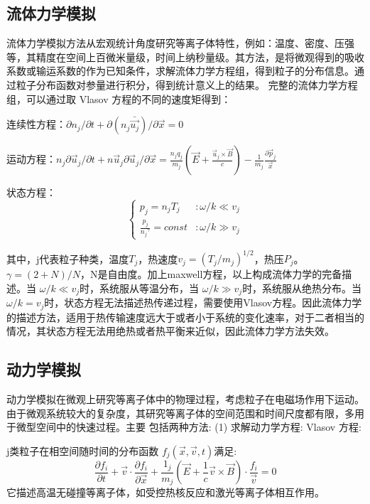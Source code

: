 \subsection{流体力学模拟}


流体力学模拟方法从宏观统计角度研究等离子体特性，例如：温度、密度、压强等，其精度在空间上百微米量级，时间上纳秒量级。其方法，是将微观得到的吸收系数或输运系数的作为已知条件，求解流体力学方程组，得到粒子的分布信息。通过粒子分布函数对参量进行积分，得到统计意义上的结果。
完整的流体力学方程组，可以通过取 Vlasov 方程的不同的速度矩得到：

连续性方程：$\partial{n_j}/\partial{t}+\partial{(n_j \bar{\vec{u_j}})}/\partial{\vec{x}} =0$


运动方程：$n_j \partial {\vec{u}_j}/\partial{t}+n \vec{u}_j \partial{\vec{u}_j}/\partial{\vec{x}} = \frac{n_j q_j}{m_j} ( \vec{E}+\frac{\vec{u}_j \times \vec{B}}{c}) - \frac{1}{m_j} \frac{\partial{\vec{p}_j}}{\vec{x}}$

状态方程：
\begin{equation}
  \begin{cases}
    p_j=n_j T_j & : \omega / k \ll v_j\\
    \frac{p_j}{{n_j}^{\gamma}}=const & : \omega / k \gg v_j
  \end{cases}
\end{equation}



其中，j代表粒子种类，温度$T_j$，热速度$v_j=(T_j/m_j)^{1/2}$，热压$P_j$。
$\gamma=(2+N)/N$，N是自由度。加上maxwell方程，以上构成流体力学的完备描述。当 $\omega / k \ll v_j$时，系统服从等温分布，当 $\omega / k \gg v_j$时，系统服从绝热分布。当 $\omega / k = v_j$时，状态方程无法描述热传递过程，需要使用Vlasov方程。因此流体力学的描述方法，适用于热传输速度远大于或者小于系统的变化速率，对于二者相当的情况，其状态方程无法用绝热或者热平衡来近似，因此流体力学方法失效。

\subsection{动力学模拟}


动力学模拟在微观上研究等离子体中的物理过程，考虑粒子在电磁场作用下运动。由于微观系统较大的复杂度，其研究等离子体的空间范围和时间尺度都有限，多用于微型空间中的快速过程。主要
包括两种方法:
(1) 求解动力学方程:
Vlasov 方程:

j类粒子在相空间随时间的分布函数 $f_j(\vec{x},\vec{v},t)$满足:
\begin{equation}
\frac{\partial{f_i}}{\partial{t}} + \vec{v} \cdot \frac{\partial{f_i}}{\partial{\vec{x}}} + \frac{1_j}{m_j}(\vec{E}+\frac{1}{c} \vec{v} \times \vec{B}) \cdot \frac{f_i}{\vec{v}}=0
\end{equation}
它描述高温无碰撞等离子体，如受控热核反应和激光等离子体相互作用。




